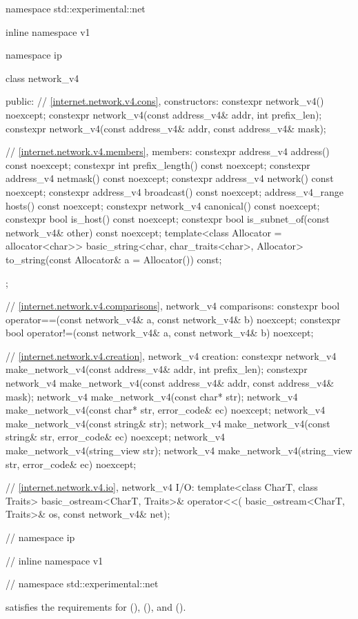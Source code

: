 \begin{codeblock}
namespace std::experimental::net {
inline namespace v1 {
namespace ip {

  class network_v4
  {
  public:
    // \ref{internet.network.v4.cons}, constructors:
    constexpr network_v4() noexcept;
    constexpr network_v4(const address_v4& addr, int prefix_len);
    constexpr network_v4(const address_v4& addr, const address_v4& mask);

    // \ref{internet.network.v4.members}, members:
    constexpr address_v4 address() const noexcept;
    constexpr int prefix_length() const noexcept;
    constexpr address_v4 netmask() const noexcept;
    constexpr address_v4 network() const noexcept;
    constexpr address_v4 broadcast() const noexcept;
    address_v4_range hosts() const noexcept;
    constexpr network_v4 canonical() const noexcept;
    constexpr bool is_host() const noexcept;
    constexpr bool is_subnet_of(const network_v4& other) const noexcept;
    template<class Allocator = allocator<char>>
      basic_string<char, char_traits<char>, Allocator>
        to_string(const Allocator& a = Allocator()) const;
  };

  // \ref{internet.network.v4.comparisons}, network_v4 comparisons:
  constexpr bool operator==(const network_v4& a, const network_v4& b) noexcept;
  constexpr bool operator!=(const network_v4& a, const network_v4& b) noexcept;

  // \ref{internet.network.v4.creation}, network_v4 creation:
  constexpr network_v4 make_network_v4(const address_v4& addr, int prefix_len);
  constexpr network_v4 make_network_v4(const address_v4& addr, const address_v4& mask);
  network_v4 make_network_v4(const char* str);
  network_v4 make_network_v4(const char* str, error_code& ec) noexcept;
  network_v4 make_network_v4(const string& str);
  network_v4 make_network_v4(const string& str, error_code& ec) noexcept;
  network_v4 make_network_v4(string_view str);
  network_v4 make_network_v4(string_view str, error_code& ec) noexcept;

  // \ref{internet.network.v4.io}, network_v4 I/O:
  template<class CharT, class Traits>
    basic_ostream<CharT, Traits>& operator<<(
      basic_ostream<CharT, Traits>& os, const network_v4& net);

} // namespace ip
} // inline namespace v1
} // namespace std::experimental::net
\end{codeblock}

\pnum
{} satisfies the requirements for  (),  (), and  ().


